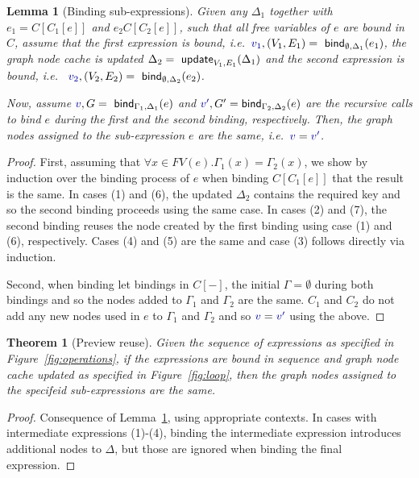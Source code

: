 \documentclass[sigplan,10pt,review,anonymous]{acmart}\settopmatter{printfolios=true,printccs=false,printacmref=false}
\newcounter{thc}
\theoremstyle{plain}
\newtheorem{lem}[thc]{Lemma}
\newtheorem{theorem}[thc]{Theorem}
\theoremstyle{definition}
\newcommand{\ident}[1]{\textnormal{\sffamily #1}}
\newcommand{\bndclr}[1]{\textcolor{kvdclr}{#1}}
\begin{document}
\begin{lem}[Binding sub-expressions]
\label{thm:sub-expr}
Given any $\Delta_1$ together with $e_1 = C[C_1[e]]$ and $e_2 C[C_2[e]]$, such that all free 
variables of $e$ are bound in $C$, assume that the first expression is bound,
i.e.~$\bndclr{v_1}, (V_1, E_1) = \ident{bind}_{\emptyset, \Delta_1}(e_1)$, the graph node cache
is updated $\Delta_2 = \ident{update}_{V_1, E_1}(\Delta_1)$ and the second expression is bound, i.e.~
$\bndclr{v_2}, (V_2, E_2) = \ident{bind}_{\emptyset, \Delta_2}(e_2)$. 

Now, assume $\bndclr{v}, G = \ident{bind}_{\Gamma_1, \Delta_1}(e)$ and 
$\bndclr{v'}, G' = \ident{bind}_{\Gamma_2, \Delta_2}(e)$ are the recursive calls to bind
$e$ during the first and the second binding, respectively. Then, the graph nodes assigned to the
sub-expression $e$ are the same, i.e.~$\bndclr{v} = \bndclr{v'}$.
\end{lem}
\begin{proof}
First, assuming that $\forall x\in FV(e). \Gamma_1(x) = \Gamma_2(x)$, we show by induction over the binding process of $e$
when binding $C[C_1[e]]$ that the result is the same. In cases (1) and (6), the updated $\Delta_2$
contains the required key and so the second binding proceeds using the same case. In cases 
(2) and (7), the second binding reuses the node created by the first binding using case (1) and
(6), respectively. Cases (4) and (5) are the same and case (3) follows directly via induction. 

Second, when binding let bindings in $C[-]$, the initial $\Gamma = \emptyset$ during both bindings
and so the nodes added to $\Gamma_1$ and $\Gamma_2$ are the same. $C_1$ and $C_2$ do not add
any new nodes used in $e$ to $\Gamma_1$ and $\Gamma_2$ and so $\bndclr{v} = \bndclr{v'}$
using the above.
\end{proof}

\begin{theorem}[Preview reuse]
Given the sequence of expressions as specified in Figure~\ref{fig:operations}, if the expressions
are bound in sequence and graph node cache updated as specified in Figure~\ref{fig:loop}, then 
the graph nodes assigned to the specifeid sub-expressions are the same.
\end{theorem}
\begin{proof}
Consequence of Lemma~\ref{thm:sub-expr}, using appropriate contexts. In cases with 
intermediate expressions (1)-(4), binding the intermediate expression introduces additional
nodes to $\Delta$, but those are ignored when binding the final expression.
\end{proof}
  
\end{document}
